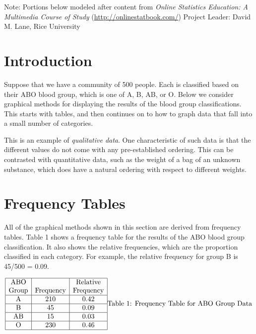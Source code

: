 \documentclass[
]{book}
\begin{document}
Note: Portions below modeled after content from
\emph{Online Statistics Education: A Multimedia Course of Study}
(\url{http://onlinestatbook.com/}) Project Leader: David M. Lane, Rice University

\hypertarget{introduction}{%
\section{Introduction}\label{introduction}}

Suppose that we have a community of 500 people. Each is classified based on
their ABO blood group, which is one of A, B, AB, or O. Below we consider
graphical methods for displaying the results of the blood group classifications.
This starts with tables, and then continues on to how to graph data that
fall into a small number of categories.

This is an example of \emph{qualitative data}. One characteristic of such data is
that the different values do not come with any pre-established ordering.
This can be contrasted with quantitative data, such as the weight of a bag of an
unknown substance, which does have a natural ordering with respect to
different weights.

\hypertarget{frequency-tables}{%
\section{Frequency Tables}\label{frequency-tables}}

All of the graphical methods shown in this section are derived from frequency
tables. Table 1 shows a frequency table for the results of the ABO blood group
classification. It also shows the
relative frequencies, which are the proportion classified in each category.
For example, the relative frequency for group B is 45/500 = 0.09.

\[
\begin{array}{|c|c|c|} \hline
\mathrm{ABO} & & \mathrm{Relative} \\
\mathrm{Group} & \mathrm{Frequency} & \mathrm{Frequency} \\ \hline
\mathrm{A} & 210 & 0.42 \\  \hline
\mathrm{B} & 45  & 0.09 \\  \hline
\mathrm{AB} & 15 & 0.03 \\  \hline
\mathrm{O} & 230 & 0.46 \\  \hline
\end{array}\\
\mbox{Table 1: Frequency Table for ABO Group Data}
\]
\end{document}
